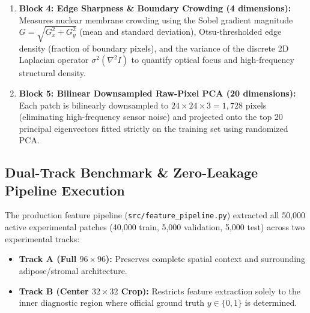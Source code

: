 \documentclass[11pt,a4paper]{article}
\begin{document}
\begin{enumerate}[leftmargin=*]
    \item \textbf{Block 4: Edge Sharpness \& Boundary Crowding (4 dimensions):}
    Measures nuclear membrane crowding using the Sobel gradient magnitude $G = \sqrt{G_x^2 + G_y^2}$ (mean and standard deviation), Otsu-thresholded edge density (fraction of boundary pixels), and the variance of the discrete 2D Laplacian operator $\sigma^2(\nabla^2 I)$ to quantify optical focus and high-frequency structural density.
    
    \item \textbf{Block 5: Bilinear Downsampled Raw-Pixel PCA (20 dimensions):}
    Each patch is bilinearly downsampled to $24 \times 24 \times 3 = 1,728$ pixels (eliminating high-frequency sensor noise) and projected onto the top 20 principal eigenvectors fitted strictly on the training set using randomized PCA.
\end{enumerate}

\subsection{Dual-Track Benchmark \& Zero-Leakage Pipeline Execution}
The production feature pipeline (\texttt{src/feature\_pipeline.py}) extracted all 50,000 active experimental patches (40,000 train, 5,000 validation, 5,000 test) across two experimental tracks:
\begin{itemize}[noitemsep]
    \item \textbf{Track A (Full $96 \times 96$):} Preserves complete spatial context and surrounding adipose/stromal architecture.
    \item \textbf{Track B (Center $32 \times 32$ Crop):} Restricts feature extraction solely to the inner diagnostic region where official ground truth $y \in \{0, 1\}$ is determined.
\end{itemize}
\end{document}
